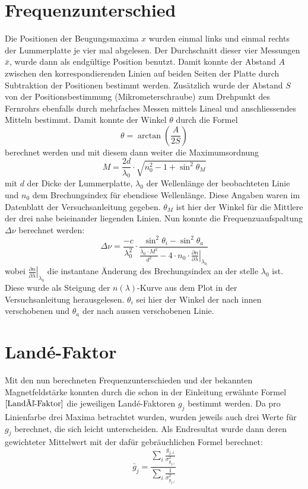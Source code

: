 \documentclass[a4paper,parskip,11pt, DIV12]{scrreprt}
\begin{document}
	\section{Frequenzunterschied}
	
	Die Positionen der Beugungsmaxima $x$ wurden einmal links und einmal rechts der Lummerplatte je vier mal abgelesen. Der Durchschnitt dieser vier Messungen $\bar{x}$, wurde dann als endgültige Position benutzt. Damit konnte der Abstand $A$ zwischen den korrespondierenden Linien auf beiden Seiten der Platte durch Subtraktion der Positionen bestimmt werden. Zusätzlich wurde der Abstand $S$ von der Positionsbestimmung (Mikrometerschraube) zum Drehpunkt des Fernrohrs ebenfalls durch mehrfaches Messen mittels Lineal und anschliessendes Mitteln bestimmt. 
Damit konnte der Winkel $\theta$ durch die Formel \begin{equation}
\theta = \arctan(\frac{A}{2 S})
\end{equation} berechnet werden und mit diesem dann weiter die Maximumsordnung \begin{equation} M = \frac{2d}{\lambda_0} \cdot \sqrt{n_0^2-1+\sin^2\theta_M}
\end{equation} mit $d$ der Dicke der Lummerplatte, $\lambda_0$ der Wellenlänge der beobachteten Linie und $n_0$ dem Brechungsindex für ebendiese Wellenlänge. Diese Angaben waren im Datenblatt der Versuchsanleitung gegeben. $\theta_M$ ist hier der Winkel für die Mittlere der drei nahe beieinander liegenden Linien. 
Nun konnte die Frequenzuaufspaltung $\Delta \nu$ berechnet werden: \begin{equation}
	\label{Frequenzunterschied}
	\Delta \nu = \frac{-c}{\lambda_0^2}\cdot\frac{\sin^2\theta_i-\sin^2\theta_a}{\frac{\lambda_0 \cdot M^2}{d^2}-4\cdot n_0 \cdot \left.\frac{\partial n}{\partial \lambda}\right|_{\lambda_0}}
	\end{equation} wobei $\left.\frac{\partial n}{\partial \lambda}\right|_{\lambda_0}$ die instantane Änderung des Brechungsindex an der stelle $\lambda_0$ ist. Diese wurde als Steigung der $n(\lambda)$-Kurve aus dem Plot in der Versuchsanleitung herausgelesen. $\theta_i$ sei hier der Winkel der nach innen verschobenen  und $\theta_a$ der nach aussen verschobenen Linie.
	\section{Landé-Faktor}
	
	Mit den nun berechneten Frequenzunterschieden und der bekannten Magnetfeldstärke konnten durch die schon in der Einleitung erwähnte Formel $\eqref{Landé-Faktor}$ die jeweiligen Landé-Faktoren $g_j$ bestimmt werden. Da pro Linienfarbe drei Maxima betrachtet wurden, wurden jeweils auch drei Werte für $g_j$ berechnet, die sich leicht unterscheiden. Als Endresultat wurde dann deren gewichteter Mittelwert mit der dafür gebräuchlichen Formel berechnet: \begin{equation}
	\bar{g}_j = \frac{\sum_i\frac{g_{j,i}}{\sigma_{g_{j,i}}^2}}{\sum_i \frac{1}{\sigma_{g_{j,i}}^2}} 
	\end{equation}
 
\end{document}
